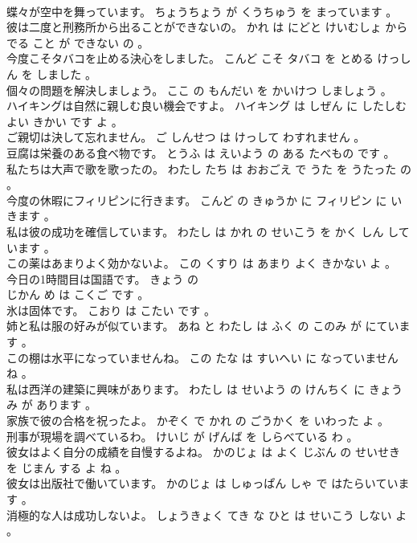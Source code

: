 \documentclass[8pt]{extreport}
\begin{document}
\begin{CJK}{UTF8}{min}
\\	蝶々が空中を舞っています。	ちょうちょう が くうちゅう を まっています 。 
\\	彼は二度と刑務所から出ることができないの。	かれ は にどと けいむしょ から でる こと が できない の 。 
\\	今度こそタバコを止める決心をしました。	こんど こそ タバコ を とめる けっしん を しました 。 
\\	個々の問題を解決しましょう。	ここ の もんだい を かいけつ しましょう 。 
\\	ハイキングは自然に親しむ良い機会ですよ。	ハイキング は しぜん に したしむ よい きかい です よ 。 
\\	ご親切は決して忘れません。	ご しんせつ は けっして わすれません 。 
\\	豆腐は栄養のある食べ物です。	とうふ は えいよう の ある たべもの です 。 
\\	私たちは大声で歌を歌ったの。	わたし たち は おおごえ で うた を うたった の 。 
\\	今度の休暇にフィリピンに行きます。	こんど の きゅうか に フィリピン に いきます 。 
\\	私は彼の成功を確信しています。	わたし は かれ の せいこう を かく しん しています 。 
\\	この薬はあまりよく効かないよ。	この くすり は あまり よく きかない よ 。 
\\	今日の1時間目は国語です。	きょう の 
\\	じかん め は こくご です 。 
\\	氷は固体です。	こおり は こたい です 。 
\\	姉と私は服の好みが似ています。	あね と わたし は ふく の このみ が にています 。 
\\	この棚は水平になっていませんね。	この たな は すいへい に なっていません ね 。 
\\	私は西洋の建築に興味があります。	わたし は せいよう の けんちく に きょうみ が あります 。 
\\	家族で彼の合格を祝ったよ。	かぞく で かれ の ごうかく を いわった よ 。 
\\	刑事が現場を調べているわ。	けいじ が げんば を しらべている わ 。 
\\	彼女はよく自分の成績を自慢するよね。	かのじょ は よく じぶん の せいせき を じまん する よ ね 。 
\\	彼女は出版社で働いています。	かのじょ は しゅっぱん しゃ で はたらいています 。 
\\	消極的な人は成功しないよ。	しょうきょく てき な ひと は せいこう しない よ 。 

\end{CJK}
\end{document}
